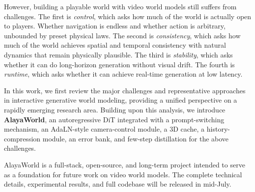 However, building a playable world with video world models still suffers from challenges.
The first is \textit{control}, which asks how much of the world is actually open to players. Whether navigation is endless and whether action is arbitrary, unbounded by preset physical laws.
The second is \textit{consistency}, which asks how much of the world achieves spatial and temporal consistency with natural dynamics that remain physically plausible. 
The third is \textit{stability}, which asks whether it can do long-horizon generation without visual drift.
The fourth is \textit{runtime}, which asks whether it can achieve real-time generation at low latency.

In this work, we first review the major challenges and representative approaches in interactive generative world modeling, providing a unified perspective on a rapidly emerging research area.
Building upon this analysis, we introduce \textbf{AlayaWorld}, an autoregressive DiT integrated with a prompt-switching mechanism, an AdaLN-style camera-control module, a 3D cache, a history-compression module, an error bank, and few-step distillation for the above challenges.

AlayaWorld is a full-stack, open-source, and long-term project intended to serve as a foundation for future work on video world models. The complete technical details, experimental results, and full codebase will be released in mid-July.